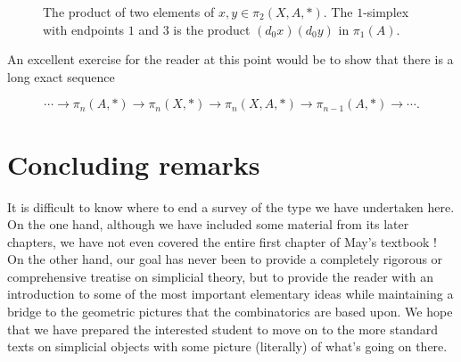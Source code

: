 \documentclass[12pt]{article}
\theoremstyle{plain}
\theoremstyle{definition}
\begin{document}
\begin{figure}[!htp]
\begin{center}
\end{center}
\caption{The product of two elements of $x,y\in \pi_2(X,A,*)$. The $1$-simplex with endpoints $1$ and $3$ is the product $(d_0x)(d_0y)$ in $\pi_1(A)$.}\label{F: fig28}
\end{figure}


An excellent exercise for the reader at this point would be to show that there is a long exact sequence 

$$\cdots \to\pi_n(A,*)\to\pi_n(X,*)\to\pi_n(X,A,*)\to \pi_{n-1}(A,*)\to\cdots .$$


\section{Concluding remarks}\label{S: concluding}

It is difficult to know where to end a survey of the type we have undertaken here. On the one hand, although we have included some material from its later chapters,
we have not even covered the entire first chapter of May's textbook \cite{MAY67}! On the other hand, our goal has never been to provide a completely rigorous or comprehensive treatise on simplicial theory, but to provide the reader with an introduction to some of the most important elementary ideas while maintaining a bridge to the geometric pictures that the combinatorics are based upon. We hope that we have prepared the interested student to move on to the more standard texts on simplicial objects with some picture (literally) of what's going on there. 
\end{document}
